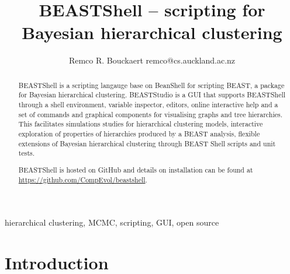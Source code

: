 \documentclass[twoside,11pt]{article}
\begin{document}
\title{BEASTShell -- scripting for Bayesian hierarchical clustering}
\author{\name Remco R. Bouckaert \email remco@cs.auckland.ac.nz}
\editor{---}
\maketitle

\begin{abstract}
BEASTShell is a scripting langauge base on BeanShell for scripting BEAST,
a package for Bayesian hierarchical clustering. BEASTStudio is a GUI that 
supports BEASTShell through a shell environment, variable inspector, editors, 
online interactive help and a set of commands and graphical components for 
visualising graphs and tree hierarchies.
This facilitates simulations studies for hierarchical clustering models,
interactive exploration of properties of hierarchies produced by a BEAST 
analysis, flexible extensions of Bayesian hierarchical clustering through 
BEAST Shell scripts and unit tests.

BEASTShell is hosted on GitHub and details on installation can be found at
\url{https://github.com/CompEvol/beastshell}.
\end{abstract}
\begin{keywords}
  hierarchical clustering, MCMC, scripting, GUI, open source
\end{keywords}

\section{Introduction}
\end{document}
